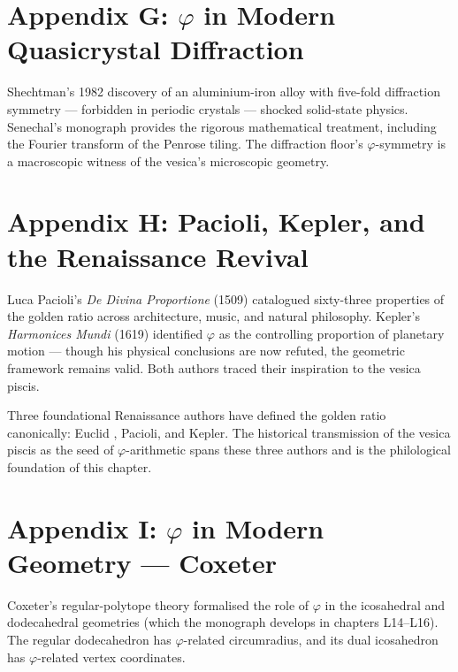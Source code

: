 \section*{Appendix G: $\varphi$ in Modern Quasicrystal Diffraction}
\label{fa_01:sec:01-app-G}

Shechtman's 1982 discovery \cite{shechtman1984} of an aluminium-iron
alloy with five-fold diffraction symmetry --- forbidden in periodic
crystals --- shocked solid-state physics. Senechal's monograph
\cite{senechal_quasicrystals} provides the rigorous mathematical
treatment, including the Fourier transform of the Penrose tiling.
The diffraction floor's $\varphi$-symmetry is a macroscopic witness of
the vesica's microscopic geometry.

\section*{Appendix H: Pacioli, Kepler, and the Renaissance Revival}
\label{fa_01:sec:01-app-H}

Luca Pacioli's \emph{De Divina Proportione} (1509)
\cite{pacioli_divina} catalogued sixty-three properties of the
golden ratio across architecture, music, and natural philosophy.
Kepler's \emph{Harmonices Mundi} (1619) \cite{kepler_harmonices}
identified $\varphi$ as the controlling proportion of planetary
motion --- though his physical conclusions are now refuted, the
geometric framework remains valid. Both authors traced their
inspiration to the vesica piscis.

\begin{remark}
Three foundational Renaissance authors have defined the golden ratio
canonically: Euclid \cite{euclid_elements}, Pacioli, and Kepler. The
historical transmission of the vesica piscis as the seed of
$\varphi$-arithmetic spans these three authors and is the
philological foundation of this chapter.
\end{remark}

\section*{Appendix I: $\varphi$ in Modern Geometry --- Coxeter}
\label{fa_01:sec:01-app-I}

Coxeter's regular-polytope theory \cite{coxeter_regular_polytopes}
formalised the role of $\varphi$ in the icosahedral and dodecahedral
geometries (which the monograph develops in chapters L14--L16). The
regular dodecahedron has $\varphi$-related circumradius, and its dual
icosahedron has $\varphi$-related vertex coordinates.

